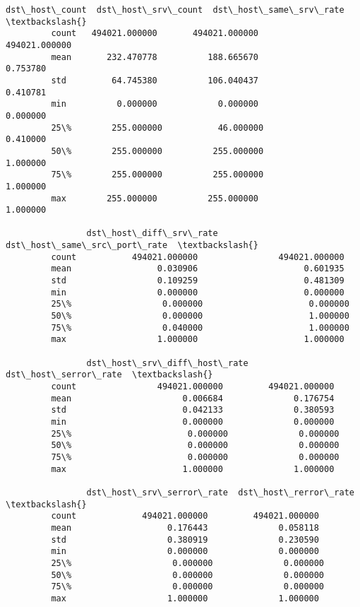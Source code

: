 \documentclass[11pt]{article}
\begin{document}
\begin{Verbatim}[commandchars=\\\{\}]
                dst\_host\_count  dst\_host\_srv\_count  dst\_host\_same\_srv\_rate  \textbackslash{}
         count   494021.000000       494021.000000           494021.000000   
         mean       232.470778          188.665670                0.753780   
         std         64.745380          106.040437                0.410781   
         min          0.000000            0.000000                0.000000   
         25\%        255.000000           46.000000                0.410000   
         50\%        255.000000          255.000000                1.000000   
         75\%        255.000000          255.000000                1.000000   
         max        255.000000          255.000000                1.000000   
         
                dst\_host\_diff\_srv\_rate  dst\_host\_same\_src\_port\_rate  \textbackslash{}
         count           494021.000000                494021.000000   
         mean                 0.030906                     0.601935   
         std                  0.109259                     0.481309   
         min                  0.000000                     0.000000   
         25\%                  0.000000                     0.000000   
         50\%                  0.000000                     1.000000   
         75\%                  0.040000                     1.000000   
         max                  1.000000                     1.000000   
         
                dst\_host\_srv\_diff\_host\_rate  dst\_host\_serror\_rate  \textbackslash{}
         count                494021.000000         494021.000000   
         mean                      0.006684              0.176754   
         std                       0.042133              0.380593   
         min                       0.000000              0.000000   
         25\%                       0.000000              0.000000   
         50\%                       0.000000              0.000000   
         75\%                       0.000000              0.000000   
         max                       1.000000              1.000000   
         
                dst\_host\_srv\_serror\_rate  dst\_host\_rerror\_rate  \textbackslash{}
         count             494021.000000         494021.000000   
         mean                   0.176443              0.058118   
         std                    0.380919              0.230590   
         min                    0.000000              0.000000   
         25\%                    0.000000              0.000000   
         50\%                    0.000000              0.000000   
         75\%                    0.000000              0.000000   
         max                    1.000000              1.000000   
         

\end{Verbatim}
\end{document}
